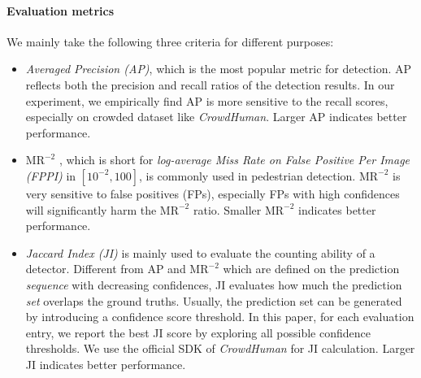 \documentclass[10pt,twocolumn,letterpaper]{article}
\begin{document}
\paragraph{Evaluation metrics} We mainly take the following three criteria for different purposes:
\begin{itemize}
	\item \emph{Averaged Precision (AP)}, which is the most popular metric for detection. AP reflects both the precision and recall ratios of the detection results. In our experiment, we empirically find AP is more sensitive to the recall scores, especially on crowded dataset like \emph{CrowdHuman}. Larger AP indicates better performance.
	
	\item  \emph{$\text{MR}^{-2}$} \cite{dollar2012pedestrian}, which is short for \emph{log-average Miss Rate on False Positive Per Image (FPPI)} in $[10^{-2}, 100]$, is commonly used in pedestrian detection. $\text{MR}^{-2}$ is very sensitive to false positives (FPs), especially FPs with high confidences will significantly harm the $\text{MR}^{-2}$ ratio. Smaller $\text{MR}^{-2}$ indicates better performance. 
	
	\item \emph{Jaccard Index (JI)} \cite{liu2016ssd} is mainly used to evaluate the counting ability of a detector. Different from AP and $\text{MR}^{-2}$ which are defined on the prediction \emph{sequence} with decreasing confidences, JI evaluates how much the prediction \emph{set} overlaps the ground truths. Usually, the prediction set can be generated by introducing a confidence score threshold. In this paper, for each evaluation entry, we report the best JI score by exploring all possible confidence thresholds. We use the official SDK of \emph{CrowdHuman} \cite{shao2018crowdhuman} for JI calculation. Larger JI indicates better performance.
	
\end{itemize} 
 
 	
\end{document}
